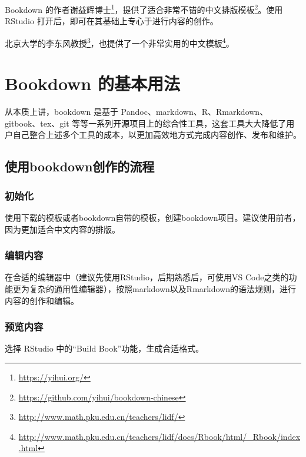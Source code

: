 \documentclass[]{ctexbook}
\renewcommand{\href}[2]{#2\footnote{\url{#1}}}
\begin{document}
Bookdown 的作者\href{https://yihui.org/}{谢益辉博士}，提供了适合非常\href{https://github.com/yihui/bookdown-chinese}{不错的中文排版模板}。使用 RStudio 打开后，即可在其基础上专心于进行内容的创作。

北京大学的\href{http://www.math.pku.edu.cn/teachers/lidf/}{李东风教授}，也提供了一个\href{http://www.math.pku.edu.cn/teachers/lidf/docs/Rbook/html/_Rbook/index.html}{非常实用的中文模板}。

\hypertarget{basic}{%
\chapter{Bookdown 的基本用法}\label{basic}}

从本质上讲，bookdown 是基于 Pandoc、markdown、R、Rmarkdown、gitbook、tex、git 等等一系列开源项目上的综合性工具，这套工具大大降低了用户自己整合上述多个工具的成本，以更加高效地方式完成内容创作、发布和维护。

\hypertarget{ux4f7fux7528bookdownux521bux4f5cux7684ux6d41ux7a0b}{%
\section{使用bookdown创作的流程}\label{ux4f7fux7528bookdownux521bux4f5cux7684ux6d41ux7a0b}}

\hypertarget{ux521dux59cbux5316}{%
\subsection{初始化}\label{ux521dux59cbux5316}}

使用下载的模板或者bookdown自带的模板，创建bookdown项目。建议使用前者，因为更加适合中文内容的排版。

\hypertarget{ux7f16ux8f91ux5185ux5bb9}{%
\subsection{编辑内容}\label{ux7f16ux8f91ux5185ux5bb9}}

在合适的编辑器中（建议先使用RStudio，后期熟悉后，可使用VS Code之类的功能更为复杂的通用性编辑器），按照markdown以及Rmarkdown的语法规则，进行内容的创作和编辑。

\hypertarget{ux9884ux89c8ux5185ux5bb9}{%
\subsection{预览内容}\label{ux9884ux89c8ux5185ux5bb9}}

选择 RStudio 中的``Build Book''功能，生成合适格式。
\end{document}
